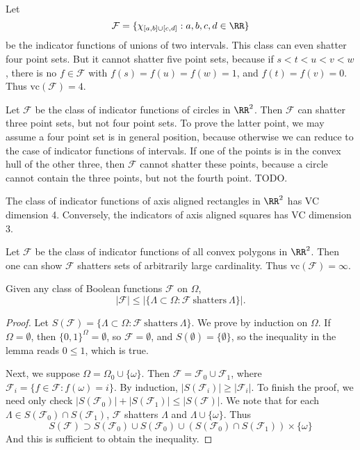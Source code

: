\begin{example}
	Let
	\[ \mathcal{F} = \{ \chi_{[a,b] \cup [c,d]}: a,b,c,d \in \RR \} \]
	be the indicator functions of unions of two intervals. This class can even shatter four point sets. But it cannot shatter five point sets, because if $s < t < u < v < w$, there is no $f \in \mathcal{F}$ with $f(s) = f(u) = f(w) = 1$, and $f(t) = f(v) = 0$. Thus $\text{vc}(\mathcal{F}) = 4$.
\end{example}

\begin{example}
	Let $\mathcal{F}$ be the class of indicator functions of circles in $\RR^2$. Then $\mathcal{F}$ can shatter three point sets, but not four point sets. To prove the latter point, we may assume a four point set is in general position, because otherwise we can reduce to the case of indicator functions of intervals. If one of the points is in the convex hull of the other three, then $\mathcal{F}$ cannot shatter these points, because a circle cannot contain the three points, but not the fourth point. TODO.
\end{example}

\begin{example}
	The class of indicator functions of axis aligned rectangles in $\RR^2$ has VC dimension 4. Conversely, the indicators of axis aligned squares has VC dimension 3.
\end{example}

\begin{example}
	Let $\mathcal{F}$ be the class of indicator functions of all convex polygons in $\RR^2$. Then one can show $\mathcal{F}$ shatters sets of arbitrarily large cardinality. Thus $\text{vc}(\mathcal{F}) = \infty$.
\end{example}

\begin{lemma}
	Given any class of Boolean functions $\mathcal{F}$ on $\Omega$,
	\[ |\mathcal{F}| \leq | \{ \Lambda \subset \Omega : \mathcal{F}\ \text{shatters}\ \Lambda \} |. \]
\end{lemma}
\begin{proof}
	Let $S(\mathcal{F}) = \{ \Lambda \subset \Omega : \mathcal{F}\ \text{shatters}\ \Lambda \}$. We prove by induction on $\Omega$. If $\Omega = \emptyset$, then $\{ 0, 1 \}^\Omega = \emptyset$, so $\mathcal{F} = \emptyset$, and $S(\emptyset) = \{ \emptyset \}$, so the inequality in the lemma reads $0 \leq 1$, which is true.

	Next, we suppose $\Omega = \Omega_0 \cup \{ \omega \}$. Then $\mathcal{F} = \mathcal{F}_0 \cup \mathcal{F}_1$, where $\mathcal{F}_i = \{ f \in \mathcal{F} : f(\omega) = i \}$. By induction, $|S(\mathcal{F}_i)| \geq |\mathcal{F}_i|$. To finish the proof, we need only check $|S(\mathcal{F}_0)| + |S(\mathcal{F}_1)| \leq |S(\mathcal{F})|$. We note that for each $\Lambda \in S(\mathcal{F}_0) \cap S(\mathcal{F}_1)$, $\mathcal{F}$ shatters $\Lambda$ and $\Lambda \cup \{ \omega \}$. Thus
	\[ S(\mathcal{F}) \supset S(\mathcal{F}_0) \cup S(\mathcal{F}_0) \cup (S(\mathcal{F}_0) \cap S(\mathcal{F}_1)) \times \{ \omega \} \]
	And this is sufficient to obtain the inequality.
\end{proof}

